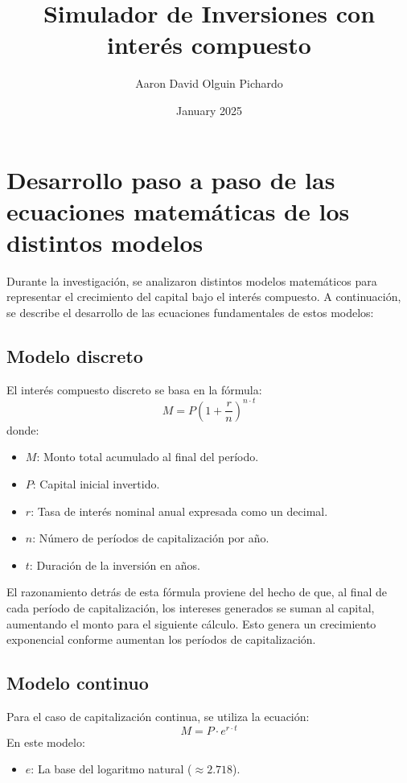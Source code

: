 \documentclass{article}
\title{Simulador de Inversiones con interés compuesto}
\author{Aaron David Olguin Pichardo}
\date{January 2025}
\begin{document}
\maketitle

\section{Desarrollo paso a paso de las ecuaciones matemáticas de los distintos modelos}
Durante la investigación, se analizaron distintos modelos matemáticos para representar el crecimiento del capital bajo el interés compuesto. A continuación, se describe el desarrollo de las ecuaciones fundamentales de estos modelos:

\subsection{Modelo discreto}
El interés compuesto discreto se basa en la fórmula:
\begin{equation}
M = P \left(1 + \frac{r}{n}\right)^{n \cdot t}
\end{equation}
donde:
\begin{itemize}
    \item $M$: Monto total acumulado al final del período.
    \item $P$: Capital inicial invertido.
    \item $r$: Tasa de interés nominal anual expresada como un decimal.
    \item $n$: Número de períodos de capitalización por año.
    \item $t$: Duración de la inversión en años.
\end{itemize}

El razonamiento detrás de esta fórmula proviene del hecho de que, al final de cada período de capitalización, los intereses generados se suman al capital, aumentando el monto para el siguiente cálculo. Esto genera un crecimiento exponencial conforme aumentan los períodos de capitalización.

\subsection{Modelo continuo}
Para el caso de capitalización continua, se utiliza la ecuación:
\begin{equation}
M = P \cdot e^{r \cdot t}
\end{equation}
En este modelo:
\begin{itemize}
    \item $e$: La base del logaritmo natural ($\approx 2.718$).
\end{itemize}
\end{document}

